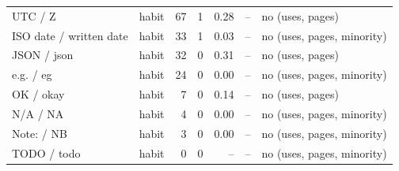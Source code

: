 \begin{tabular}{llrrrll}
UTC / Z & habit & 67 & 1 & 0.28 & -- & no (uses, pages) \\
ISO date / written date & habit & 33 & 1 & 0.03 & -- & no (uses, pages, minority) \\
JSON / json & habit & 32 & 0 & 0.31 & -- & no (uses, pages) \\
e.g. / eg & habit & 24 & 0 & 0.00 & -- & no (uses, pages, minority) \\
OK / okay & habit & 7 & 0 & 0.14 & -- & no (uses, pages) \\
N/A / NA & habit & 4 & 0 & 0.00 & -- & no (uses, pages, minority) \\
Note: / NB & habit & 3 & 0 & 0.00 & -- & no (uses, pages, minority) \\
TODO / todo & habit & 0 & 0 & -- & -- & no (uses, pages, minority) \\
\bottomrule
\end{tabular}

